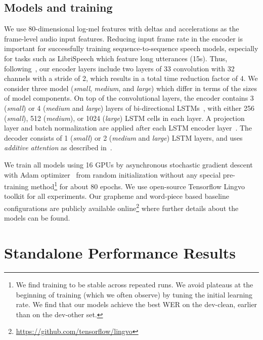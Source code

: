 \documentclass[a4paper]{article}
\begin{document}
\subsection{Models and training}
\vspace{-1mm}
\label{sec:model_tr}
We use 80-dimensional log-mel features with deltas and accelerations as the
frame-level audio input features.
Reducing input frame rate in the encoder is important for successfully training
sequence-to-sequence speech models, especially for tasks such as LibriSpeech
which feature long utterances (15s).
Thus, following~\cite{zhangCJ17}, our encoder layers include two layers of 33 convolution
with 32 channels with a stride of 2, which results in a total time reduction factor of 4.
We consider three model (\textit{small}, \textit{medium}, and \textit{large})
which differ in terms of the sizes of model components.
On top of the convolutional layers, the encoder contains 3 (\textit{small}) or 4
(\textit{medium} and \textit{large}) layers of bi-directional
LSTMs~\cite{schuster1997bidirectional}, with either 256 (\textit{small}), 512
(\textit{medium}), or 1024 (\textit{large}) LSTM \cite{hochreiter1997long} cells
in each layer.
A projection layer and batch normalization are applied after each LSTM encoder
layer~\cite{zhangCJ17}.
The decoder consists of 1 (\textit{small}) or 2 (\textit{medium} and
\textit{large}) LSTM layers, and uses \emph{additive attention} as described in~\cite{WeissCJWC17}.


We train all models using 16 GPUs by asynchronous stochastic gradient descent
with Adam optimizer~\cite{kingma15} from random initialization without any
special pre-training method\footnote{We find training to be stable across repeated runs.
We avoid plateaus at the beginning of training (which we often observe) by tuning the initial learning rate.
We find that our models achieve the best WER on the dev-clean, earlier than on the dev-other set.} for about 80 epochs.
We use open-source Tensorflow Lingvo toolkit \cite{shen2019lingvo} for all experiments. Our
grapheme and word-piece based baseline configurations are publicly available online\footnote{\url{https://github.com/tensorflow/lingvo}}
where further details about the models can be found.

\vspace{-2mm}
\section{Standalone Performance Results}
\label{sec:part1}
\end{document}
